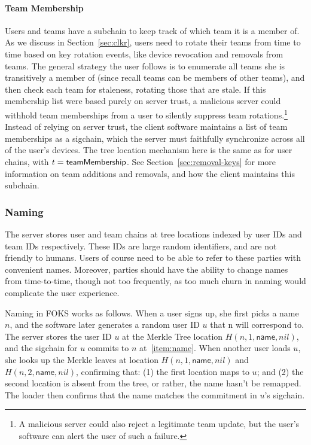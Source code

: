 \paragraph{Team Membership} Users and teams have a subchain to keep track
of which team it is a member of. As we discuss in Section~\ref{sec:clkr},
users need to rotate their teams from time to time based on key rotation
events, like device revocation and removals from teams. The general strategy
the user follows is to enumerate all teams she is transitively a member
of (since recall teams can be members of other teams), and then check
each team for staleness, rotating those that are stale. If this membership
list were based purely on server trust, a malicious server could withhold
team memberships from a user to silently suppress team rotations.\footnote{
    A malicious server could also reject a legitimate team update, but the user's
    software can alert the user of such a failure.
} Instead of relying on server trust, the client software maintains a list
of team memberships as a sigchain, which the server must faithfully
synchronize across all of the user's devices. The tree location
mechanism here is the same as for user chains, with $t = \textsf{teamMembership}$.
See Section~\ref{sec:removal-keys} for more information on team additions
and removals, and how the client maintains this subchain.

\subsubsection{Naming}
\label{sec:naming}

The server stores user and team chains at tree locations indexed by user IDs
and team IDs respectively. These IDs are large random identifiers, and are not
friendly to humans. Users of course need to be able to refer to these parties
with convenient names. Moreover, parties should have the ability to change
names from time-to-time, though not too frequently, as too much churn in naming would
complicate the user experience. 

Naming in FOKS works as follows. When a user signs up, she first picks a name
$n$, and the software later generates a random user ID $u$ that n will
correspond to. The server stores the user ID $u$ at the Merkle Tree
location $H(n, 1, \textsf{name}, nil)$, and the sigchain for $u$
commits to $n$ at~\ref{item:name}. When another user loads $u$, she
looks up the Merkle leaves at location $H(n, 1, \textsf{name}, nil)$
and $H(n, 2, \textsf{name}, nil)$, confirming that: (1) the first location
maps to $u$; and (2) the second location is absent from the tree,
or rather, the name hasn't be remapped. The loader then confirms
that the name matches the commitment in $u$'s sigchain. 

